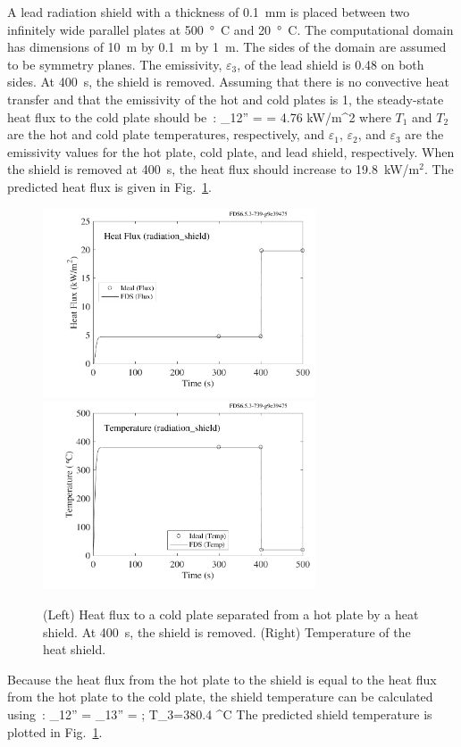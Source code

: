 \documentclass[11pt]{book}
\begin{document}
A lead radiation shield with a thickness of 0.1~mm is placed between two infinitely wide parallel plates at 500~\si{\degree C} and 20~\si{\degree C}.  The computational domain has dimensions of 10~m by 0.1~m by 1~m. The sides of the domain are assumed to be symmetry planes.  The emissivity, $\varepsilon_{3}$, of the lead shield is 0.48 on both sides.  At 400~s, the shield is removed.  Assuming that there is no convective heat transfer and that the emissivity of the hot and cold plates is 1, the steady-state heat flux to the cold plate should be~\cite{Incropera:1}:
\be
   \dq_{12}'' =  = 4.76 \; \hbox{kW/m}^2
\ee
where $T_{1}$ and $T_{2}$ are the hot and cold plate temperatures, respectively, and $\varepsilon_1$, $\varepsilon_2$, and $\varepsilon_3$ are the emissivity values for the hot plate, cold plate, and lead shield, respectively. When the shield is removed at 400~s, the heat flux should increase to 19.8~kW/m$^2$.  The predicted heat flux is given in Fig.~\ref{radiation_shield_plot}.
\begin{figure}[ht]
\includegraphics[height=2.2in]{SCRIPT_FIGURES/radiation_shield_flux}
\includegraphics[height=2.2in]{SCRIPT_FIGURES/radiation_shield_temp}
\caption[The  test case]{(Left) Heat flux to a cold plate separated from a hot plate by a heat shield. At 400~s, the shield is removed. (Right) Temperature of the heat shield.}
\label{radiation_shield_plot}
\end{figure}
Because the heat flux from the hot plate to the shield is equal to the heat flux from the hot plate to the cold plate, the shield temperature can be calculated using~\cite{Incropera:1}:
\be
   \dq_{12}'' = \dq_{13}'' =  \quad ; \quad T_3=380.4 \; ^\circ\hbox{C}
\ee
The predicted shield temperature is plotted in Fig.~\ref{radiation_shield_plot}.
\end{document}
